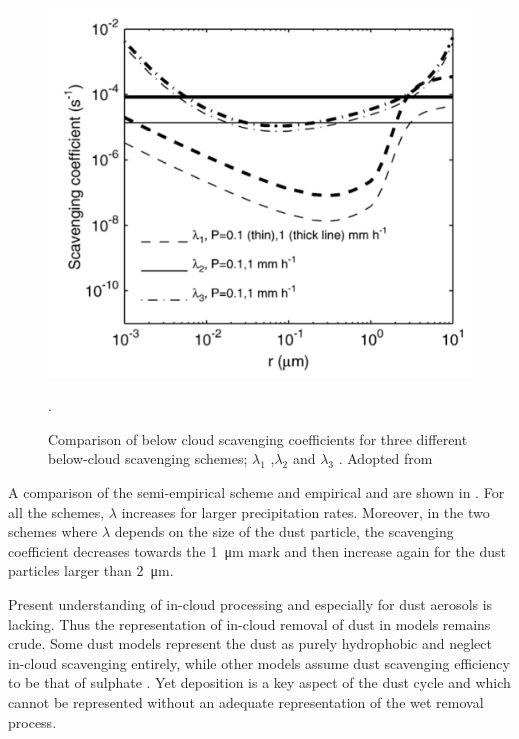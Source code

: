 \begin{figure}[htpb]
    \centering
    \includegraphics[draft=False,scale=.5]{texfiles/figs/Scavenging.PNG}
    \caption{Comparison of below cloud scavenging coefficients for three different below-cloud scavenging schemes; $\lambda_1$ \textcite{jung2006intercomparison},$\lambda_2$ \textcite{brandt2002modelling} and $\lambda_3$ \textcite{laakso2003ultrafine}. Adopted from \textcite{jung2006intercomparison}}.
    \label{fig:scavenging}
\end{figure}
A comparison of the semi-empirical \textcite{ShaoYaping2008PaMo} scheme and empirical \textcite{brandt2002modelling} and \textcite{laakso2003ultrafine} are shown in . For all the schemes, $\lambda$ increases for larger precipitation rates. Moreover, in the two schemes where $\lambda$ depends on the size of the dust particle, the scavenging coefficient decreases towards the \SI{1}{\micro\metre} mark and then increase again for the dust particles larger than \SI{2}{\micro\metre}.

Present understanding of in-cloud processing and especially for dust aerosols is lacking. 
Thus the representation of in-cloud removal of dust in models remains crude. Some dust models represent the dust as purely hydrophobic and neglect in-cloud scavenging entirely, while other models assume dust scavenging efficiency to be that of sulphate \parencite{bergametti2014dust}. 
Yet deposition is a key aspect of the dust cycle and which cannot be represented without an adequate representation of the wet removal process.
